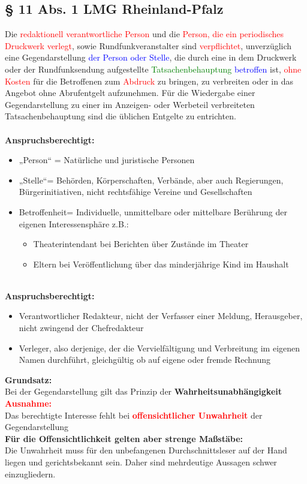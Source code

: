 \subsection{§ 11 Abs. 1 LMG Rheinland-Pfalz}
Die \textcolor{red}{redaktionell verantwortliche Person} und die \textcolor{red}{Person, die ein periodisches Druckwerk verlegt}, sowie Rundfunkveranstalter sind \textcolor{red}{verpflichtet}, unverzüglich eine Gegendarstellung \textcolor{blue}{der Person oder Stelle}, die durch eine in dem Druckwerk oder der Rundfunksendung aufgestellte \textcolor{green}{Tatsachenbehauptung} \textcolor{blue}{betroffen} ist, \textcolor{red}{ohne Kosten} für die Betroffenen zum \textcolor{red}{Abdruck} zu bringen, zu verbreiten oder in das Angebot ohne Abrufentgelt aufzunehmen. Für die Wiedergabe einer Gegendarstellung zu einer im Anzeigen- oder Werbeteil verbreiteten Tatsachenbehauptung sind die üblichen Entgelte zu entrichten.\\
\qquad\\
\textbf{Anspruchsberechtigt:}
\begin{itemize}
    \item „Person“ = Natürliche und juristische Personen
    \item „Stelle“= Behörden, Körperschaften, Verbände, aber auch Regierungen, Bürgerinitiativen, nicht rechtsfähige Vereine und Gesellschaften
    \item Betroffenheit= Individuelle, unmittelbare oder mittelbare Berührung der eigenen Interessensphäre z.B.:
    \begin{itemize}
        \item Theaterintendant bei Berichten über Zustände im Theater
        \item Eltern bei Veröffentlichung über das minderjährige Kind im Haushalt
    \end{itemize}
\end{itemize}
\qquad\\
\textbf{Anspruchsberechtigt:}
\begin{itemize}
    \item Verantwortlicher Redakteur, nicht der Verfasser einer Meldung, Herausgeber, nicht zwingend der Chefredakteur
    \item Verleger, also derjenige, der die Vervielfältigung und Verbreitung im eigenen Namen durchführt, gleichgültig ob auf eigene oder fremde Rechnung
\end{itemize}
\textbf{Grundsatz:}\\
Bei der Gegendarstellung gilt das Prinzip der \textbf{Wahrheitsunabhängigkeit}\\
\textcolor{red}{\textbf{Ausnahme:}}\\
Das berechtigte Interesse fehlt bei \textcolor{red}{\textbf{offensichtlicher Unwahrheit}} der Gegendarstellung\\
\textbf{Für die Offensichtlichkeit gelten aber strenge Maßstäbe:}\\
Die Unwahrheit muss für den unbefangenen Durchschnittsleser auf der Hand liegen und gerichtsbekannt sein. Daher sind mehrdeutige Aussagen schwer einzugliedern. 

